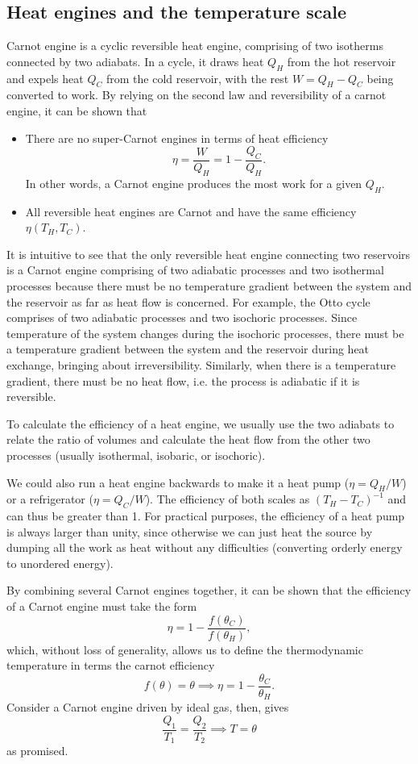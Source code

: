 \documentclass{article}
\theoremstyle{nonumberplain}
\begin{document}
\subsection{Heat engines and the temperature scale}
Carnot engine is a cyclic reversible heat engine, comprising of two isotherms connected by two adiabats. In a cycle, it draws heat $Q_H$ from the hot reservoir and expels heat $Q_C$ from the cold reservoir, with the rest $W = Q_H - Q_C$ being converted to work. By relying on the second law and reversibility of a carnot engine, it can be shown that
\begin{itemize}
    \item There are no super-Carnot engines in terms of heat efficiency 
    \[
        \eta  = \frac{W}{Q_H} = 1 - \frac{Q_C}{Q_H}.
    \]
    In other words, a Carnot engine produces the most work for a given $Q_H.$
    \item All reversible heat engines are Carnot and have the same efficiency $\eta(T_H, T_C).$
\end{itemize}

It is intuitive to see that the only reversible heat engine connecting two reservoirs is a Carnot engine comprising of two adiabatic processes and two isothermal processes because there must be no temperature gradient between the system and the reservoir as far as heat flow is concerned. For example, the Otto cycle comprises of two adiabatic processes and two isochoric processes. Since temperature of the system changes during the isochoric processes, there must be a temperature gradient between the system and the reservoir during heat exchange, bringing about irreversibility. Similarly, when there is a temperature gradient, there must be no heat flow, i.e. the process is adiabatic if it is reversible. 

To calculate the efficiency of a heat engine, we usually use the two adiabats to relate the ratio of volumes and calculate the heat flow from the other two processes (usually isothermal, isobaric, or isochoric).

We could also run a heat engine backwards to make it a heat pump ($\eta = Q_H / W$) or a refrigerator ($\eta  = Q_C / W$). The efficiency of both scales as $(T_H - T_C )^{-1}$ and can thus be greater than 1. For practical purposes, the efficiency of a heat pump is always larger than unity, since otherwise we can just heat the source by dumping all the work as heat without any difficulties (converting orderly energy to unordered energy).

By combining several Carnot engines together, it can be shown that the efficiency of a Carnot engine must take the form
\[
    \eta = 1- \frac{f(\theta_C)}{f(\theta_H)},
\]
which, without loss of generality, allows us to define the thermodynamic temperature in terms the carnot efficiency 
\[
    f(\theta ) = \theta \implies \eta  = 1 - \frac{\theta_C}{\theta_H}.
\]
Consider a Carnot engine driven by ideal gas, then, gives
\[
    \boxed{\frac{Q_1}{T_1} = \frac{Q_2}{T_2}} \implies  
    T = \theta
\]
as promised. 
\end{document}
